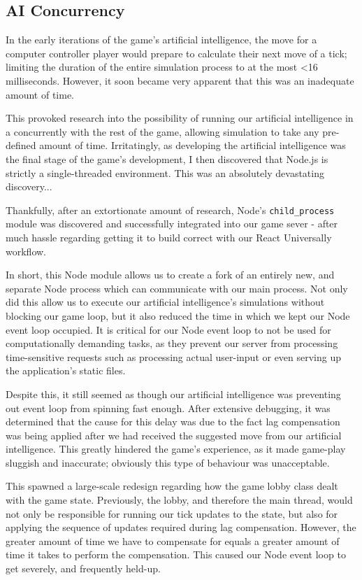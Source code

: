 \documentclass{standalone}
\begin{document}
		\subsection{AI Concurrency}
			In the early iterations of the game's artificial intelligence, the move for a computer controller player would prepare to calculate their next move of a tick; limiting the duration of the entire simulation process to at the most \textless 16 milliseconds. However, it soon became very apparent that this was an inadequate amount of time.

			This provoked research into the possibility of running our artificial intelligence in a concurrently with the rest of the game, allowing simulation to take any pre-defined amount of time. Irritatingly, as developing the artificial intelligence was the final stage of the game's development, I then discovered that Node.js is strictly a single-threaded environment. This was an absolutely devastating discovery...

			Thankfully, after an extortionate amount of research, Node's \texttt{child\_process} module \parencite{nodeChildProcess} was discovered and successfully integrated into our game sever - after much hassle regarding getting it to build correct with our React Universally workflow.

			In short, this Node module allows us to create a fork of an entirely new, and separate Node process which can communicate with our main process. Not only did this allow us to execute our artificial intelligence's simulations without blocking our game loop, but it also reduced the time in which we kept our Node event loop occupied. It is critical for our Node event loop to not be used for computationally demanding tasks, as they prevent our server from processing time-sensitive requests such as processing actual user-input or even serving up the application's static files.

			Despite this, it still seemed as though our artificial intelligence was preventing out event loop from spinning fast enough. After extensive debugging, it was determined that the cause for this delay was due to the fact lag compensation was being applied after we had received the suggested move from our artificial intelligence. This greatly hindered the game's experience, as it made game-play sluggish and inaccurate; obviously this type of behaviour was unacceptable.

			This spawned a large-scale redesign regarding how the game lobby class dealt with the game state. Previously, the lobby, and therefore the main thread, would not only be responsible for running our tick updates to the state, but also for applying the sequence of updates required during lag compensation. However, the greater amount of time we have to compensate for equals a greater amount of time it takes to perform the compensation. This caused our Node event loop to get severely, and frequently held-up.
\end{document}
